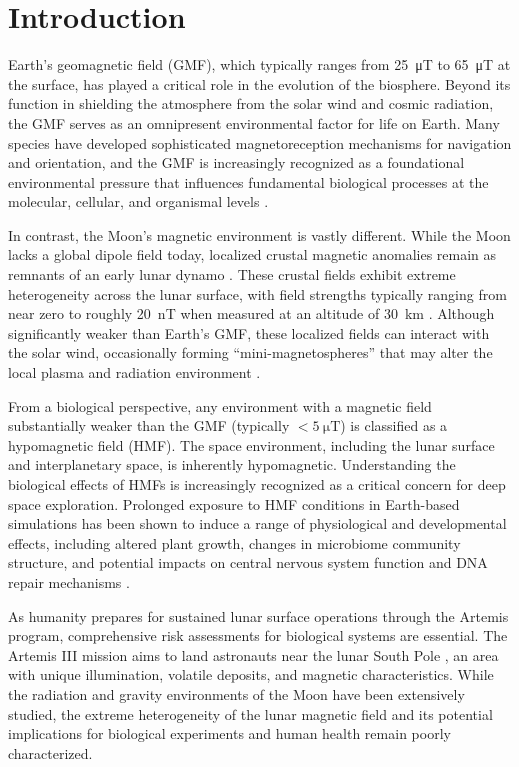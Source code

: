\section{Introduction}
\label{sec:intro}

Earth's geomagnetic field (GMF), which typically ranges from \SI{25}{\micro\tesla} to \SI{65}{\micro\tesla} at the surface, has played a critical role in the evolution of the biosphere. Beyond its function in shielding the atmosphere from the solar wind and cosmic radiation, the GMF serves as an omnipresent environmental factor for life on Earth. Many species have developed sophisticated magnetoreception mechanisms for navigation and orientation, and the GMF is increasingly recognized as a foundational environmental pressure that influences fundamental biological processes at the molecular, cellular, and organismal levels \citep{Mo2012, Binhi2017}. 

In contrast, the Moon's magnetic environment is vastly different. While the Moon lacks a global dipole field today, localized crustal magnetic anomalies remain as remnants of an early lunar dynamo \citep{Wieczorek2006}. These crustal fields exhibit extreme heterogeneity across the lunar surface, with field strengths typically ranging from near zero to roughly \SI{20}{\nano\tesla} when measured at an altitude of \SI{30}{\kilo\meter} \citep{Tsunakawa2015, Hood2020}. Although significantly weaker than Earth's GMF, these localized fields can interact with the solar wind, occasionally forming ``mini-magnetospheres'' that may alter the local plasma and radiation environment \citep{Mitchell2008}.

From a biological perspective, any environment with a magnetic field substantially weaker than the GMF (typically $< \SI{5}{\micro\tesla}$) is classified as a hypomagnetic field (HMF). The space environment, including the lunar surface and interplanetary space, is inherently hypomagnetic. Understanding the biological effects of HMFs is increasingly recognized as a critical concern for deep space exploration. Prolonged exposure to HMF conditions in Earth-based simulations has been shown to induce a range of physiological and developmental effects, including altered plant growth, changes in microbiome community structure, and potential impacts on central nervous system function and DNA repair mechanisms \citep{Maffei2014, Mo2014}. 

As humanity prepares for sustained lunar surface operations through the Artemis program, comprehensive risk assessments for biological systems are essential. The Artemis III mission aims to land astronauts near the lunar South Pole \citep{NASA2022}, an area with unique illumination, volatile deposits, and magnetic characteristics. While the radiation and gravity environments of the Moon have been extensively studied, the extreme heterogeneity of the lunar magnetic field and its potential implications for biological experiments and human health remain poorly characterized.

